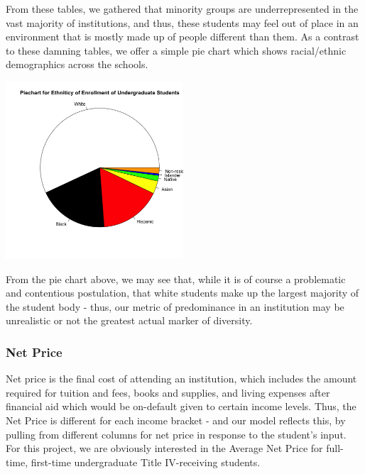 \documentclass{article}\usepackage[]{graphicx}\usepackage[]{color}
\newenvironment{knitrout}{}{} %
\begin{document}
From these tables, we gathered that minority groups are underrepresented in the vast majority of institutions, and thus, these students may feel out of place in an environment that is mostly made up of people different than them. As a contrast to these damning tables, we offer a simple pie chart which shows racial/ethnic demographics across the schools.

\begin{knitrout}
\color{fgcolor}

{\centering \includegraphics[width=250px]{../images/piechart-enrollmentEthnicity} 

}



\end{knitrout}

From the pie chart above, we may see that, while it is of course a problematic and contentious postulation, that white students make up the largest majority of the student body - thus, our metric of predominance in an institution may be unrealistic or not the greatest actual marker of diversity. 

\subsubsection{Net Price}
Net price is the final cost of attending an institution, which includes the amount required for tuition and fees, books and supplies, and living expenses after financial aid which would be on-default given to certain income levels. Thus, the Net Price is different for each income bracket - and our model reflects this, by pulling from different columns for net price in response to the student's input. For this project, we are obviously interested in the Average Net Price for full-time, first-time undergraduate Title IV-receiving students. 
\end{document}
